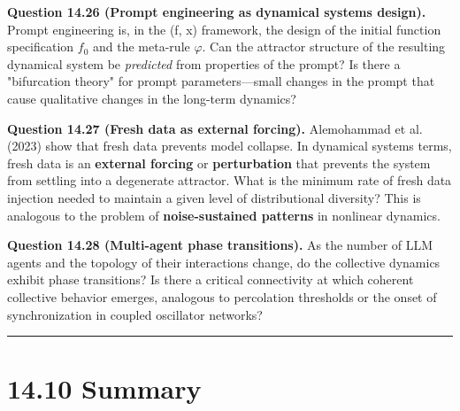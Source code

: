 \textbf{Question 14.26 (Prompt engineering as dynamical systems design).} Prompt engineering is, in the (f, x) framework, the design of the initial function specification $f_0$ and the meta-rule $\varphi$. Can the attractor structure of the resulting dynamical system be \textit{predicted} from properties of the prompt? Is there a "bifurcation theory" for prompt parameters---small changes in the prompt that cause qualitative changes in the long-term dynamics?

\textbf{Question 14.27 (Fresh data as external forcing).} Alemohammad et al. (2023) show that fresh data prevents model collapse. In dynamical systems terms, fresh data is an \textbf{external forcing} or \textbf{perturbation} that prevents the system from settling into a degenerate attractor. What is the minimum rate of fresh data injection needed to maintain a given level of distributional diversity? This is analogous to the problem of \textbf{noise-sustained patterns} in nonlinear dynamics.

\textbf{Question 14.28 (Multi-agent phase transitions).} As the number of LLM agents and the topology of their interactions change, do the collective dynamics exhibit phase transitions? Is there a critical connectivity at which coherent collective behavior emerges, analogous to percolation thresholds or the onset of synchronization in coupled oscillator networks?

\bigskip\hrule\bigskip

\section{14.10 Summary}

